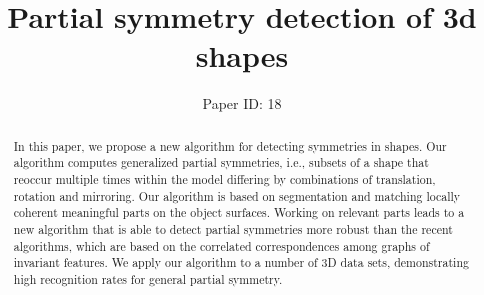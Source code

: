 \documentclass[twocolumn]{svjour3}          %
\begin{document}
\title{Partial symmetry detection of 3d shapes}
\subtitle{}
\author{Paper ID: 18}
\institute{}
\date{ }%

\maketitle

\begin{abstract}
In this paper, we propose a new algorithm for detecting symmetries in shapes.
Our algorithm computes generalized partial symmetries, i.e.,
subsets of a shape that reoccur multiple times within the model differing by combinations of translation, rotation and mirroring.
Our algorithm is based on segmentation and matching locally coherent meaningful parts on the object surfaces.
Working on relevant parts leads to a new algorithm that is able to detect partial symmetries more robust than the recent algorithms,
which are based on the correlated correspondences among graphs of invariant features.
We apply our algorithm to a number of 3D data sets, demonstrating high recognition rates for general partial symmetry.

\end{abstract}









\end{document}
